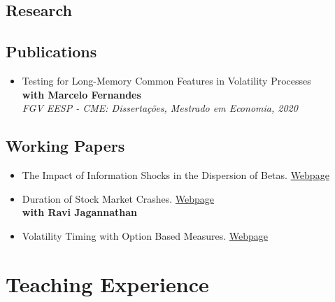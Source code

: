 \documentclass[a4paper,10pt]{article}
\begin{document}
\clearpage
\begin{samepage}
    \section{Research}
    \subsection{Publications}
    \begin{itemize}[label={}]
        \item Testing for Long-Memory Common Features in Volatility Processes \\
            \textbf{with Marcelo Fernandes} \\
            \textit{FGV EESP - CME: Dissertações, Mestrado em Economia, 2020}
    \end{itemize}
    \subsection{Working Papers}
    \begin{itemize}
        \item The Impact of Information Shocks in the Dispersion of Betas. \href{https://joseparreiras.github.io/projects/news-and-betas}{Webpage}
        \item Duration of Stock Market Crashes. \href{https://joseparreiras.github.io/projects/news-and-betas}{Webpage} \\
            \textbf{with Ravi Jagannathan}
        \item Volatility Timing with Option Based Measures. \href{https://joseparreiras.github.io/projects/news-and-betas}{Webpage}
    \end{itemize}
\end{samepage}


\section{Teaching Experience}
\end{document}
